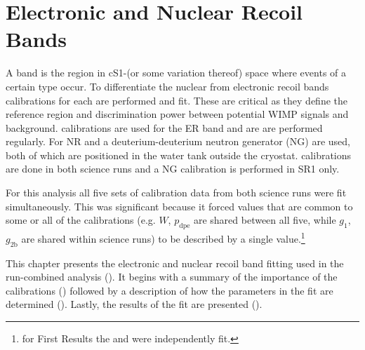 

\pagestyle{cu}
\graphicspath{{./Chapter4/Figures/}}
\chapter[Electronic and Nuclear Recoil Bands][Electronic and Nuclear Recoil Bands]{Electronic and Nuclear Recoil Bands}
\label{chap:er_nr_calibrations}



A band is the region in cS1-\cstwob (or some variation thereof) space where events of a certain type occur.  To
differentiate the nuclear from electronic recoil bands calibrations for each are performed and fit.  These are critical as
they define the reference region and discrimination power between potential WIMP signals and background.   calibrations are
used for the ER band and are are performed regularly.  For NR  and a deuterium-deuterium
neutron generator (NG) are used, both of which are positioned in the water tank outside the cryostat.  \ambe calibrations are done in
both science runs and a NG calibration is performed in SR1 only.

For this analysis all five sets of calibration data from both science runs were fit simultaneously.  This was
significant because it forced values that are common to some or all of the calibrations (e.g. $W$, $p_{\mathrm{dpe}}$ are shared
between all five, while $g_1$, $g_{2\mathrm{b}}$ are shared within science runs) to be described by a single
value.\footnote{for First Results the \radoncal and \ambe were independently fit.}

This chapter presents the electronic and nuclear recoil band fitting used in the run-combined analysis ().  It
begins with a summary of the importance of the calibrations () followed by a description of how
the parameters in the fit are determined ().  Lastly, the results of the fit are
presented ().



